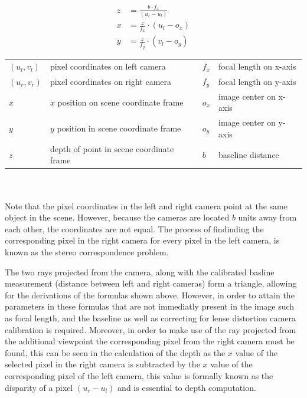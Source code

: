 \documentclass[11pt]{scrartcl}
\begin{document}
\begin{theorem}

  \begin{align}
    z & = \displaystyle\frac{b\cdot f_x}{(u_r-u_l)} \\
    x & = \displaystyle\frac{z}{f_x} \cdot (u_l - o_x) \\
    y & = \displaystyle\frac{z}{f_y} \cdot (v_l - o_y) 
  \end{align}

  \begin{figurekey}
    \begin{tabular}{llll}
      $(u_l,v_l)$ & pixel coordinates on left camera     & $f_x$ & focal length on x-axis \\
      $(u_r,v_r)$ & pixel coordinates on right camera   & $f_y$ & focal length on y-axis \\
      $x$     & $x$ position on scene coordinate frame  & $o_x$ & image center on x-axis \\
      $y$     & $y$ position in scene coordinate frame   & $o_y$ & image center on y-axis \\
        $z$     & depth of point in scene coordinate frame  &$b$ & baseline distance \\
    \end{tabular}
  \end{figurekey} \\ \\
    Note that the pixel coordinates in the left and right camera point at the same object in 
    the scene. However, because the cameras are located $b$ units away from each other, 
    the coordinates are not equal. The process of findinding the corresponding pixel in the 
    right camera for every pixel in the left camera, is known as the stereo correspondence 
    problem. 
\end{theorem}

The two rays projected from the camera, along with the calibrated basline measurement (distance
between left and right cameras) form a triangle, allowing for the derivations of the formulas
shown above. However, in order to attain the parameters in these formulas that are not 
immediatly present in the image such as focal length, and the baseline as well as correcting
for lense distortion camera calibration is required. Moreover, in order to make use of the ray 
projected from the additional viewpoint the corresponding pixel from the right camera must be 
found, this can be seen in the calculation of the depth as the $x$ value of the selected pixel 
in the right camera is subtracted by the $x$ value of the corresponding pixel of the left camera, this 
value is formally known as the disparity of a pixel $(u_r-u_l)$ and is essential to depth computation. 
\end{document}
